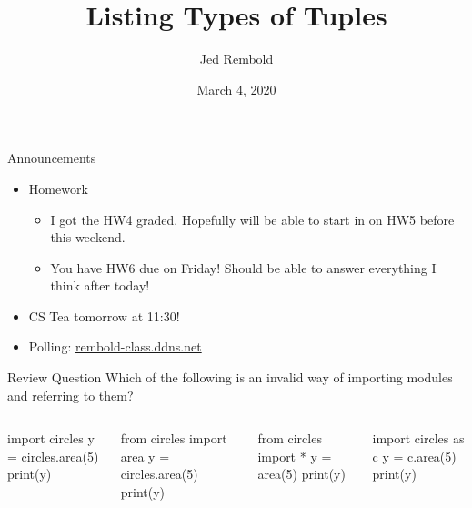 \documentclass[pdf, aspectratio=169, 12pt]{beamer}
\title{Listing Types of Tuples}
\author{Jed Rembold}
\date{March 4, 2020}
\begin{document}
\begin{frame}{Announcements}
	\begin{itemize}
		\item Homework
			\begin{itemize}
				\item I got the HW4 graded. Hopefully will be able to start in on HW5 before this weekend.
				\item You have HW6 due on Friday! Should be able to answer everything I think after today!
			\end{itemize}
		\item CS Tea tomorrow at 11:30!
		\item Polling: \url{rembold-class.ddns.net}
	\end{itemize}
\end{frame}

\begin{frame}[fragile]{Review Question}
	Which of the following is an invalid way of importing modules and referring to them?
	\begin{columns}
		\small
		\begin{pythoncode}
			import circles
			y = circles.area(5)
			print(y)
		\end{pythoncode}
		\begin{pythoncode}
			from circles import area
			y = circles.area(5)
			print(y)
		\end{pythoncode}
		\begin{pythoncode}
			from circles import *
			y = area(5)
			print(y)
		\end{pythoncode}
		\begin{pythoncode}
			import circles as c
			y = c.area(5)
			print(y)
		\end{pythoncode}
	\end{columns}
\end{frame}
\end{document}
